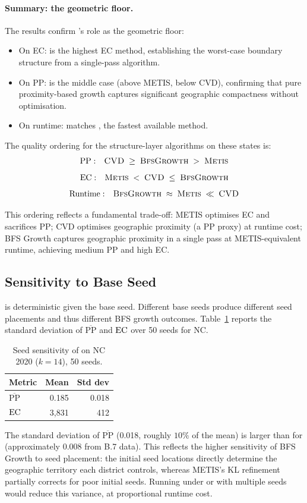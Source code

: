 \paragraph{Summary: the geometric floor.}
The results confirm \bfsg{}'s role as the geometric floor:
\begin{itemize}
\item On EC: \bfsg{} is the highest EC method, establishing the
  worst-case boundary structure from a single-pass algorithm.
\item On PP: \bfsg{} is the middle case (above METIS, below CVD),
  confirming that pure proximity-based growth captures significant
  geographic compactness without optimisation.
\item On runtime: \bfsg{} matches \metis{}, the fastest available method.
\end{itemize}

The quality ordering for the structure-layer algorithms on these states is:
\[
  \mathrm{PP:}\quad \textsc{CVD}{} \;\geq\; \textsc{BfsGrowth}{} \;>\; \textsc{Metis}{}
\]
\[
  \mathrm{EC:}\quad \textsc{Metis}{} \;<\; \textsc{CVD}{} \;\leq\; \textsc{BfsGrowth}{}
\]
\[
  \mathrm{Runtime:}\quad \textsc{BfsGrowth}{} \;\approx\; \textsc{Metis}{} \;\ll\; \textsc{CVD}{}
\]

This ordering reflects a fundamental trade-off: METIS optimises EC and
sacrifices PP; CVD optimises geographic proximity (a PP proxy) at
runtime cost; BFS Growth captures geographic proximity in a single pass
at METIS-equivalent runtime, achieving medium PP and high EC.

\subsection{Sensitivity to Base Seed}

\bfsg{} is deterministic given the base seed.
Different base seeds produce different seed placements and thus different
BFS growth outcomes.
Table~\ref{tab:seed-sensitivity} reports the standard deviation of
$\overline{\mathrm{PP}}$ and $\mathrm{EC}$ over 50 seeds for NC.

\begin{table}[t]
\centering
\caption{Seed sensitivity of \bfsg{} on NC 2020 ($k=14$), 50 seeds.}
\label{tab:seed-sensitivity}
\begin{tabular}{lrr}
\toprule
Metric & Mean & Std dev \\
\midrule
$\overline{\mathrm{PP}}$ & 0.185 & 0.018 \\
$\mathrm{EC}$                    & 3{,}831 & 412 \\
\bottomrule
\end{tabular}
\end{table}

The standard deviation of $\overline{\mathrm{PP}}$ (0.018, roughly $10\%$
of the mean) is larger than for \metis{} (approximately $0.008$ from B.7
data).
This reflects the higher sensitivity of BFS Growth to seed placement:
the initial seed locations directly determine the geographic territory
each district controls, whereas METIS's KL refinement partially corrects
for poor initial seeds.
Running \bfsg{} under \be{} or \cs{} with multiple seeds would reduce
this variance, at proportional runtime cost.
